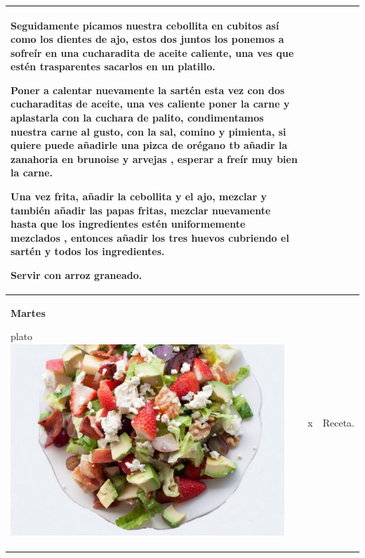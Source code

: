\documentclass[menu.tex]{subfiles}
\begin{document}
\begin{tabular} {p{3.5cm} p{4cm} p{9cm}}
Seguidamente picamos nuestra cebollita en cubitos así como los dientes de ajo, estos dos juntos los ponemos a sofreír en una cucharadita de aceite caliente, una ves que estén trasparentes sacarlos en un platillo.

Poner a calentar nuevamente la sartén esta vez con dos cucharaditas de aceite, una ves caliente poner la carne y aplastarla con la cuchara de palito, condimentamos nuestra carne al gusto, con la sal, comino y pimienta, si quiere puede añadirle una pizca de orégano tb añadir la zanahoria en brunoise y arvejas , esperar a freír muy bien la carne.

Una vez frita, añadir la cebollita y el ajo, mezclar y también añadir las papas fritas, mezclar nuevamente hasta que los ingredientes estén uniformemente mezclados , entonces añadir los tres huevos cubriendo el sartén y todos los ingredientes.

Servir con arroz graneado.\\
    \hline

    \pbox{20cm}
    {
        \rule{0pt}{3ex}\begin{large}\textbf{Martes}\end{large}\\ 
        \rule{0pt}{2ex}plato\\
        \includegraphics[scale=0.35]{ensalada-vegetal-con-carne} 
    } & 
    \vspace{-1.75cm}            
    \begin{compactitem} 
        \begin{scriptsize}
            \item x
        \end{scriptsize}
    \end{compactitem}&
    \vspace{-1.7cm}
    Receta.\\
    \hline


\end{tabular}
\end{document}
